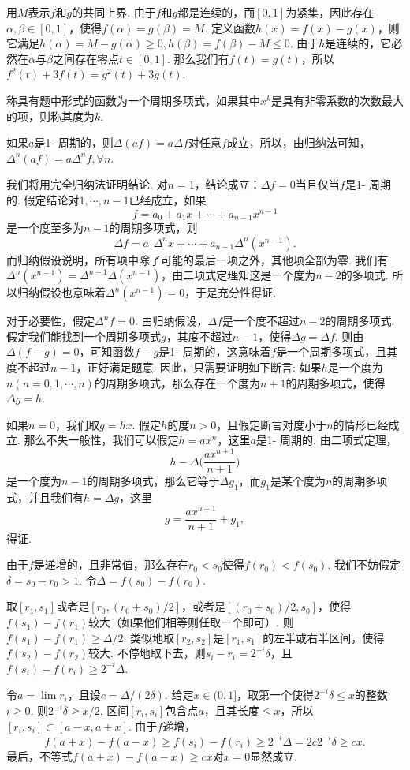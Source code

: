 \begin{ans}
  用$M$表示$f$和$g$的共同上界. 由于$f$和$g$都是连续的，而$[0,1]$为紧集，因此存在$\alpha,\beta\in[0,1]$，使得$f(\alpha)=g(\beta)=M$. 定义函数$h(x)=f(x)-g(x)$，则它满足$h(\alpha)=M-g(\alpha)\ge0,h(\beta)=f(\beta)-M\le0$. 由于$h$是连续的，它必然在$\alpha$与$\beta$之间存在零点$t\in[0,1]$. 那么我们有$f(t)=g(t)$，所以$f^2(t)+3f(t)=g^2(t)+3g(t)$.
\end{ans}

\begin{ans}
  称具有题中形式的函数为一个{\kaishu 周期多项式}，如果其中$x^k$是具有非零系数的次数最大的项，则称其{\kaishu 度}为$k$.

  如果$a$是1- 周期的，则$\Delta(af)=a\Delta f$对任意$f$成立，所以，由归纳法可知，$\Delta^n(af)=a\Delta^nf,\forall n$.

  我们将用完全归纳法证明结论. 对$n=1$，结论成立：$\Delta f=0$当且仅当$f$是1- 周期的. 假定结论对$1,\cdots,n-1$已经成立，如果
  \[ f = a_0+a_1x+\cdots+a_{n-1}x^{n-1} \]
  是一个度至多为$n-1$的周期多项式，则
  \[ \Delta f = a_1\Delta^nx+\cdots+a_{n-1}\Delta^n (x^{n-1}). \]
  而归纳假设说明，所有项中除了可能的最后一项之外，其他项全部为零. 我们有$\Delta^n(x^{n-1})=\Delta^{n-1}\Delta(x^{n-1})$，由二项式定理知这是一个度为$n-2$的多项式. 所以归纳假设也意味着$\Delta^n(x^{n-1})=0$，于是充分性得证.

  对于必要性，假定$\Delta^nf=0$. 由归纳假设，$\Delta f$是一个度不超过$n-2$的周期多项式. 假定我们能找到一个周期多项式$g$，其度不超过$n-1$，使得$\Delta g=\Delta f$. 则由$\Delta(f-g)=0$，可知函数$f-g$是1- 周期的，这意味着$f$是一个周期多项式，且其度不超过$n-1$，正好满足题意. 因此，只需要证明如下断言: 如果$h$是一个度为$n(n=0,1,\cdots,n)$的周期多项式，那么存在一个度为$n+1$的周期多项式，使得$\Delta g=h$.

  如果$n=0$，我们取$g=hx$. 假定$h$的度$n>0$，且假定断言对度小于$n$的情形已经成立. 那么不失一般性，我们可以假定$h=ax^n$，这里$a$是1- 周期的. 由二项式定理，
  \[ h-\Delta\bigg( \frac{ax^{n+1}}{n+1} \bigg) \]
  是一个度为$n-1$的周期多项式，那么它等于$\Delta g_1$，而$g_1$是某个度为$n$的周期多项式，并且我们有$h=\Delta g$，这里
  \[ g=\frac{ax^{n+1}}{n+1}+g_1, \]
  得证.
\end{ans}

\begin{ans}
  由于$f$是递增的，且非常值，那么存在$r_0<s_0$使得$f(r_0)<f(s_0)$. 我们不妨假定$\delta=s_0-r_0>1$. 令$\Delta=f(s_0)-f(r_0)$.

  取$[r_1,s_1]$或者是$[r_0,(r_0+s_0)/2]$，或者是$[(r_0+s_0)/2,s_0]$，使得$f(s_1)-f(r_1)$较大（如果他们相等则任取一个即可）. 则$f(s_1)-f(r_1)\ge\Delta/2$. 类似地取$[r_2,s_2]$是$[r_1,s_1]$的左半或右半区间，使得$f(s_2)-f(r_2)$较大. 不停地取下去，则$s_i-r_i=2^{-i}\delta$，且$f(s_i)-f(r_i)\ge2^{-i}\Delta$.

  令$a=\lim r_i$，且设$c=\Delta/(2\delta)$. 给定$x\in(0,1]$，取第一个使得$2^{-i}\delta\le x$的整数$i\ge0$. 则$2^{-i}\delta\ge x/2$. 区间$[r_i,s_i]$包含点$a$，且其长度$\le x$，所以$[r_i,s_i]\subset[a-x,a+x]$. 由于$f$递增，
  \[ f(a+x)-f(a-x)\ge f(s_i)-f(r_i)\ge2^{-i}\Delta=2c2^{-i}\delta\ge cx. \]
  最后，不等式$f(a+x)-f(a-x)\ge cx$对$x=0$显然成立.
\end{ans}

